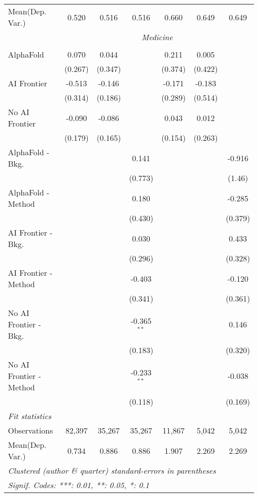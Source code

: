 \begin{tabular}{lcccccc}
Mean(Dep. Var.) & 0.520 & 0.516 & 0.516 & 0.660 & 0.649 & 0.649 \\
 & \multicolumn{6}{c}{\textit{Medicine}} \\ \\
   AlphaFold               & 0.070   & 0.044   &               & 0.211   & 0.005   &   \\   
                           & (0.267) & (0.347) &               & (0.374) & (0.422) &   \\   
   AI Frontier             & -0.513  & -0.146  &               & -0.171  & -0.183  &   \\   
                           & (0.314) & (0.186) &               & (0.289) & (0.514) &   \\   
   No AI Frontier          & -0.090  & -0.086  &               & 0.043   & 0.012   &   \\   
                           & (0.179) & (0.165) &               & (0.154) & (0.263) &   \\   
   AlphaFold - Bkg.        &         &         & 0.141         &         &         & -0.916\\   
                           &         &         & (0.773)       &         &         & (1.46)\\   
   AlphaFold - Method      &         &         & 0.180         &         &         & -0.285\\   
                           &         &         & (0.430)       &         &         & (0.379)\\   
   AI Frontier - Bkg.      &         &         & 0.030         &         &         & 0.433\\   
                           &         &         & (0.296)       &         &         & (0.328)\\   
   AI Frontier - Method    &         &         & -0.403        &         &         & -0.120\\   
                           &         &         & (0.341)       &         &         & (0.361)\\   
   No AI Frontier - Bkg.   &         &         & -0.365$^{**}$ &         &         & 0.146\\   
                           &         &         & (0.183)       &         &         & (0.320)\\   
   No AI Frontier - Method &         &         & -0.233$^{**}$ &         &         & -0.038\\   
                           &         &         & (0.118)       &         &         & (0.169)\\   
   \midrule
   \emph{Fit statistics}\\
   Observations            & 82,397  & 35,267  & 35,267        & 11,867  & 5,042   & 5,042\\  
Mean(Dep. Var.) & 0.734 & 0.886 & 0.886 & 1.907 & 2.269 & 2.269 \\
   \midrule \midrule
   \multicolumn{7}{l}{\emph{Clustered (author \& quarter) standard-errors in parentheses}}\\
   \multicolumn{7}{l}{\emph{Signif. Codes: ***: 0.01, **: 0.05, *: 0.1}}\\
\end{tabular}
\par\endgroup
